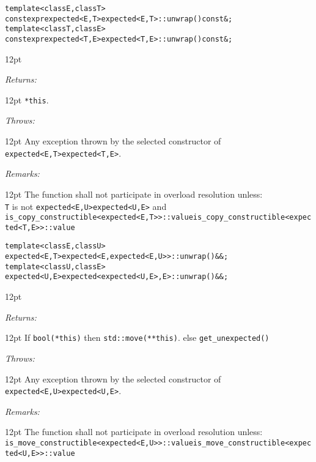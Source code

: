 \documentclass[a4paper,10pt]{article}
\newcommand{\cpp}[1]{\lstinline{#1}}
\newcommand{\wordingItem}[1]{\noindent\textit{#1:}}
\newenvironment{wordingTextItem}[1]{\wordingItem{#1}\vspace{2pt}\noindent\begin{adjustwidth}{12pt}{}}{\vspace{2pt}\end{adjustwidth}}
\newenvironment{wordingPara}{\begin{adjustwidth}{12pt}{}}{\end{adjustwidth}}
\newcommand{\suppress}[1]{\colorbox{suppress_color}{#1}}
\newcommand{\update}[1]{\colorbox{update_color}{#1}}
\begin{document}
\begin{alltt}
\suppress{    template <class E, class T>}
\suppress{    constexpr expected<E,T> expected<E,T>::unwrap() const&;}
\update{    template <class T, class E>}
\update{    constexpr expected<T,E> expected<T,E>::unwrap() const&;}
\end{alltt}

\begin{wordingPara}

\begin{wordingTextItem}{Returns}
\cpp{*this}.
\end{wordingTextItem}

\begin{wordingTextItem}{Throws}
Any exception thrown by the selected constructor of \suppress{\cpp{expected<E,T>}}\update{\cpp{expected<T,E>}}.
\end{wordingTextItem}

\begin{wordingTextItem}{Remarks}
The function shall not participate in overload resolution unless: \\
\cpp{T} is not  \suppress{\cpp{expected<E,U>}}\update{\cpp{expected<U,E>}}  and \\
\suppress{\cpp{is_copy_constructible<expected<E,T>>::value}}\update{\cpp{is_copy_constructible<expected<T,E>>::value}} \\
\end{wordingTextItem}

\end{wordingPara}

\begin{alltt}
\suppress{    template <class E, class U>}
\suppress{    expected<E,T> expected<E,  expected<E,U>>::unwrap() &&;}
\update{    template <class U, class E>}
\update{    expected<U,E> expected<expected<U,E>, E>::unwrap() &&;}
\end{alltt}

\begin{wordingPara}

\begin{wordingTextItem}{Returns}
If \cpp{bool(*this)} then \cpp{std::move(**this)}.
else \cpp{get_unexpected()}
\end{wordingTextItem}

\begin{wordingTextItem}{Throws}
Any exception thrown by the selected constructor of \suppress{\cpp{expected<E,U>}}\update{\cpp{expected<U,E>}}.
\end{wordingTextItem}

\begin{wordingTextItem}{Remarks}
The function shall not participate in overload resolution unless: \\
\suppress{\cpp{is_move_constructible<expected<E,U>>::value}}\update{\cpp{is_move_constructible<expected<U,E>>::value}} \\
\end{wordingTextItem}

\end{wordingPara}
\end{document}
